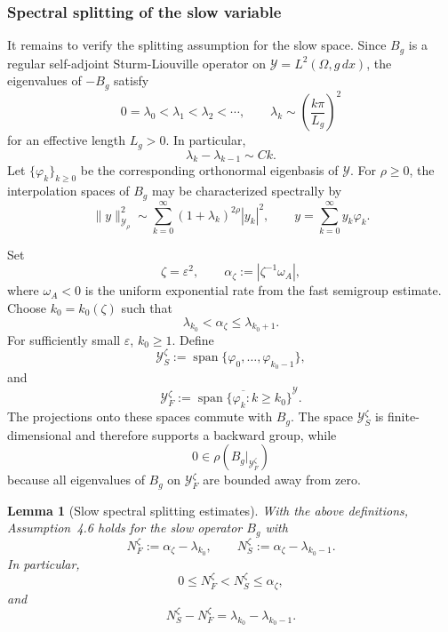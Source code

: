 \documentclass[11pt]{article}
\newtheorem{lemma}[theorem]{Lemma}
\theoremstyle{definition}
\theoremstyle{remark}
\numberwithin{equation}{section}
\begin{document}
\subsubsection*{Spectral splitting of the slow variable}
\label{subsubsec:thin-domain-slow-spectral-splitting}

It remains to verify the splitting assumption for the slow space. Since \(B_g\)
is a regular self-adjoint Sturm-Liouville operator on
\(\mathcal Y=L^2(\Omega,g\,dx)\), the eigenvalues of \(-B_g\) satisfy
\[
0=\lambda_0<\lambda_1<\lambda_2<\cdots,
\qquad
\lambda_k\sim\left(\frac{k\pi}{L_g}\right)^2
\]
for an effective length \(L_g>0\). In particular,
\[
\lambda_k-\lambda_{k-1}\sim Ck.
\]
Let \(\{\varphi_k\}_{k\ge0}\) be the corresponding orthonormal eigenbasis of
\(\mathcal Y\). For \(\rho\ge0\), the interpolation spaces of \(B_g\) may be
characterized spectrally by
\[
\|y\|_{\mathcal Y_\rho}^2
\sim
\sum_{k=0}^\infty (1+\lambda_k)^{2\rho}|y_k|^2,
\qquad
y=\sum_{k=0}^\infty y_k\varphi_k.
\]

Set
\[
\zeta=\varepsilon^2,
\qquad
\alpha_\zeta:=|\zeta^{-1}\omega_A|,
\]
where \(\omega_A<0\) is the uniform exponential rate from the fast semigroup
estimate. Choose \(k_0=k_0(\zeta)\) such that
\[
\lambda_{k_0}<\alpha_\zeta\le\lambda_{k_0+1}.
\]
For sufficiently small \(\varepsilon\), \(k_0\ge1\). Define
\[
\mathcal Y_S^\zeta
:=
\operatorname{span}\{\varphi_0,\ldots,\varphi_{k_0-1}\},
\]
and
\[
\mathcal Y_F^\zeta
:=
\overline{\operatorname{span}\{\varphi_k:k\ge k_0\}}^{\mathcal Y}.
\]
The projections onto these spaces commute with \(B_g\). The space
\(\mathcal Y_S^\zeta\) is finite-dimensional and therefore supports a backward
group, while
\[
0\in\rho(B_g|_{\mathcal Y_F^\zeta})
\]
because all eigenvalues of \(B_g\) on \(\mathcal Y_F^\zeta\) are bounded away
from zero.

\begin{lemma}[Slow spectral splitting estimates]
\label{lem:slow-spectral-splitting-estimates}
With the above definitions, Assumption~4.6 holds for the slow operator \(B_g\)
with
\[
N_F^\zeta:=\alpha_\zeta-\lambda_{k_0},
\qquad
N_S^\zeta:=\alpha_\zeta-\lambda_{k_0-1}.
\]
In particular,
\[
0\le N_F^\zeta<N_S^\zeta\le\alpha_\zeta,
\]
and
\[
N_S^\zeta-N_F^\zeta
=
\lambda_{k_0}-\lambda_{k_0-1}.
\]
\end{lemma}
\end{document}
